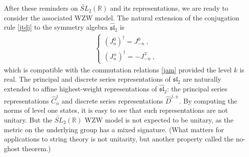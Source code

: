 \documentclass[12pt,a4paper,notitlepage]{report}
\numberwithin{equation}{section}
\theoremstyle{break}
\begin{document}
After these reminders on $\widetilde{SL}_2(\mathbb{R})$ and its representations, we are ready to consider the associated WZW model. 
The natural extension of the conjugation rule \eqref{jtdj} to the symmetry algebra $\widehat{\mathfrak{sl}}_2$ is
\begin{align}
 \left\{\begin{array}{l} (J_n^0)^\dagger = J_{-n}^0\ , \\
         (J_n^\pm)^\dagger = -J_{-n}^\mp \ ,
        \end{array}
\right.
\end{align}
which is compatible with the commutation relations \eqref{jam} provided the level $k$ is real.
The principal and discrete series representations of $\mathfrak{sl}_2$ are naturally extended to affine highest-weight representations of $\widehat{\mathfrak{sl}}_2$: the principal series representations $\hat{C}^j_\alpha$ and discrete series representations $\hat{D}^{j,\pm}$.
By computing the norms of level one states, it is easy to see that such representations are not unitary.
But the $\widetilde{SL}_2(\mathbb{R})$ WZW model is not expected to be unitary, as the metric on the underlying group has a mixed signature. (What matters for applications to string theory is not unitarity, but another property called the no-ghost theorem.) 
\end{document}
